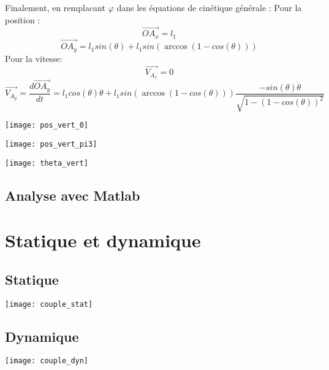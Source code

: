 \documentclass{udes_rapport} %
\begin{document}
Finalement, en remplacant $\varphi$ dans les équations de cinétique générale :
Pour la position :
\[	\overrightarrow{OA_x} = l_1	\]
\[	\overrightarrow{OA_y} = l_1 sin(\theta) + l_1 sin(\arccos(1- cos(\theta)))	\]
Pour la vitesse:
\[	\overrightarrow{V_{A_x}} = 0	\]
\[	\overrightarrow{V_{A_y}} = \frac{d\overrightarrow{OA_y}}{dt} = l_1 cos(\theta)\dot{\theta} +  l_1 sin(\arccos(1- cos(\theta))) \frac{-sin(\theta)\dot\theta}{\sqrt{1-(1-cos(\theta))^2}}	\]



\noindent\begin{minipage}{\textwidth} 
\begin{minipage}{0.5\textwidth}
  \centering
  \texttt{[image: pos\_vert\_0]}
  \label{pos_vert:position_verticale_initiale}
\end{minipage}%
\begin{minipage}{0.5\textwidth}
  \centering 
  \texttt{[image: pos\_vert\_pi3]} 
  \label{pos_vert:position_verticale_finale} 
\end{minipage} 
\label{pos_vert} 
\end{minipage}

\begin{center}
	\centering
	\texttt{[image: theta\_vert]}
	\label{composantes_verticale_theta}
\end{center}
\subsection{Analyse avec Matlab}



\section{Statique et dynamique}
\subsection{Statique}
\begin{center}
	\centering
	\texttt{[image: couple\_stat]}
	\label{couple_statique}
\end{center}
\subsection{Dynamique}
\begin{center}
	\centering
	\texttt{[image: couple\_dyn]}
	\label{couple_dynamique}
\end{center}
\end{document}
